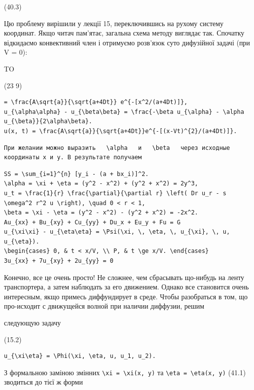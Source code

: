 \documentclass[
  ukrainian,
]{article}
\begin{document}
(40.3)

Цю проблему вирішили у лекції 15, переключившись на рухому систему
координат. Якщо читач пам'ятає, загальна схема методу виглядає так.
Спочатку відкидаємо конвективний член і отримуємо розв'язок суто
дифузійної задачі (при V = 0):

TO

(23 9)

\begin{verbatim}
= \frac{A\sqrt{a}}{\sqrt{a+4Dt}} e^{-[x^2/(a+4Dt)]},
u_{\alpha\alpha} - u_{\beta\beta} = \frac{-\beta u_{\alpha} - \alpha u_{\beta}}{2\alpha\beta}.
u(x, t) = \frac{A\sqrt{a}}{\sqrt{a+4Dt}}e^{-[(x-Vt)^{2}/(a+4Dt)]}.
\end{verbatim}

\begin{verbatim}
При желании можно выразить   \alpha   и   \beta   через исходные координаты x и y. В результате получаем
\end{verbatim}

\begin{verbatim}
SS = \sum_{i=1}^{n} [y_i - (a + bx_i)]^2.
\alpha = \xi + \eta = (y^2 - x^2) + (y^2 + x^2) = 2y^3,
u_t = \frac{1}{r} \frac{\partial}{\partial r} \left( Dr u_r - s \omega^2 r^2 u \right), \quad 0 < r < 1,
\beta = \xi - \eta = (y^2 - x^2) - (y^2 + x^2) = -2x^2.
Au_{xx} + Bu_{xy} + Cu_{yy} + Du_x + Eu_y + Fu = G
u_{\xi\xi} - u_{\eta\eta} = \Psi(\xi, \, \eta, \, u_{\xi}, \, u, u_{\eta}).
\begin{cases} 0, & t < x/V, \\ P, & t \ge x/V. \end{cases}
3u_{xx} + 7u_{xy} + 2u_{yy} = 0
\end{verbatim}

Конечно, все це очень просто! Не сложнее, чем сбрасывать що-нибудь на
ленту транспортера, а затем наблюдать за его движением. Однако все
становится очень интересным, якщо примесь диффундирует в среде. Чтобы
разобраться в том, що про-исходит с движущейся волной при наличии
диффузии, решим

следующую задачу

(15.2)

\begin{verbatim}
u_{\xi\eta} = \Phi(\xi, \eta, u, u_1, u_2).
\end{verbatim}

З формальною заміною змінних
\texttt{\textbackslash{}xi\ =\ \textbackslash{}xi(x,\ y)} та
\texttt{\textbackslash{}eta\ =\ \textbackslash{}eta(x,\ y)} (41.1)
зводиться до тієї ж форми
\end{document}
